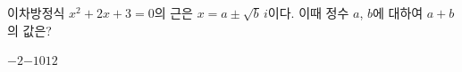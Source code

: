 이차방정식 $x^2+2x+3=0$의 근은 $x=a\pm\sqrt{b}\,i$이다. 이때 정수 $a$, $b$에 대하여 $a+b$의 값은?
\begin{choices32}{$-2$}{$-1$}{$0$}{$1$}{$2$}\end{choices32}
